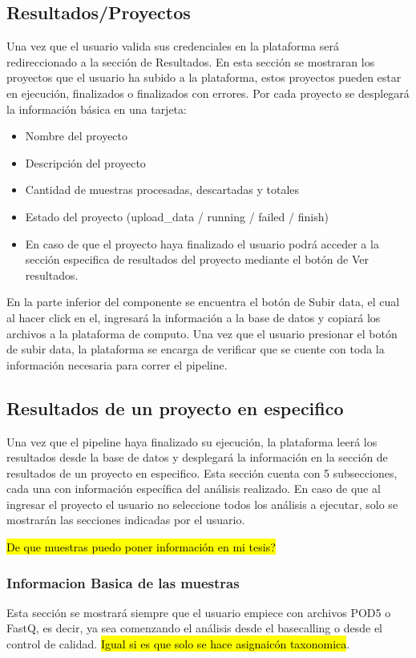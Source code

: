 \subsection{Resultados/Proyectos} \label{projects}
Una vez que el usuario valida sus credenciales en la plataforma será redireccionado a la sección de Resultados. En esta sección se mostraran los proyectos que el usuario ha subido a la plataforma, estos proyectos pueden estar en ejecución, finalizados o finalizados con errores. 
Por cada proyecto se desplegará la información básica en una tarjeta:
\begin{itemize}
    \item Nombre del proyecto
    \item Descripción del proyecto
    \item Cantidad de muestras procesadas, descartadas y totales
    \item Estado del proyecto (upload\_data / running / failed / finish)
    \item En caso de que el proyecto haya finalizado el usuario podrá acceder a la sección especifica de resultados del proyecto mediante el botón de Ver resultados.
\end{itemize}



En la parte inferior del componente se encuentra el botón de Subir data, el cual al hacer click en el, ingresará la información a la base de datos y copiará los archivos a la plataforma de computo. Una vez que el usuario presionar el botón de subir data, la plataforma se encarga de verificar que se cuente con toda la información necesaria para correr el pipeline.
\subsection{Resultados de un proyecto en especifico}
Una vez que el pipeline haya finalizado su ejecución, la plataforma leerá los resultados desde la base de datos y desplegará la información en la sección de resultados de un proyecto en especifico. Esta sección cuenta con 5 subsecciones, cada una con información específica del análisis realizado. En caso de que al ingresar el proyecto el usuario no seleccione todos los análisis a ejecutar, solo se mostrarán las secciones indicadas por el usuario.

\hl{De que muestras puedo poner información en mi tesis?}
\subsubsection{Informacion Basica de las muestras}
Esta sección se mostrará siempre que el usuario empiece con archivos POD5 o FastQ, es decir, ya sea comenzando el análisis desde el basecalling o desde el control de calidad. \hl{Igual si es que solo se hace asignaicón taxonomica}.

